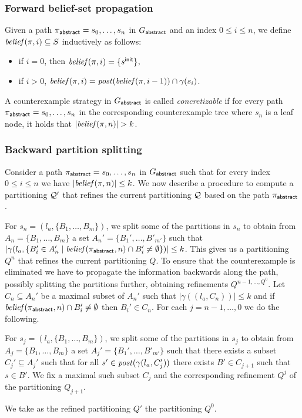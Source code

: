 \subsubsection{Forward belief-set propagation}
Given a path $\pi_{\mathsf{abstract}} = s_0,\ldots,s_n$ in $G_{\mathsf{abstract}}$ and an index $0 \leq i \leq n$, we define $\mathit{belief}(\pi,i)\subseteq S$ inductively as follows:
\begin{itemize}
\item if $i = 0$, then $\mathit{belief}(\pi,i) = \{s^{\mathsf{init}}\}$,
\item if $i > 0$, $\mathit{belief}(\pi,i) = \mathit{post}(\mathit{belief}(\pi,i-1)) \cap \gamma(s_i)$.
\end{itemize}

A counterexample strategy in $G_{\mathsf{abstract}}$ is called \emph{concretizable} if for every path $\pi_{\mathsf{abstract}} = s_0,\ldots,s_n$ in the corresponding counterexample tree where $s_n$ is a leaf node, it holds that $|\mathit{belief}(\pi,n)| > k$.

\subsubsection{Backward partition splitting}
Consider a path $\pi_{\mathsf{abstract}} = s_0,\ldots,s_n$ in $G_{\mathsf{abstract}}$ such that for every index $0 \leq i \leq n$ we have $|\mathit{belief}(\pi,n)| \leq k$. We now describe a procedure to compute a partitioning $\mathcal{Q}'$ that refines the current partitioning $\mathcal{Q}$ based on the path $\pi_{\mathsf{abstract}}$.


For $s_n  =(l_a,\{B_1,\ldots,B_m\})$, we split some of the partitions in $s_n$ to obtain from $A_n = \{B_1,\ldots,B_m\}$ a set $A_n' = \{B_1',\ldots, B'_{m'}\}$ such that $|\gamma(l_a,\{B_i' \in A_n' \mid \mathit{belief}(\pi_{\mathsf{abstract}}, n) \cap B_i' \neq \emptyset\})| \leq k$.
This gives us a partitioning $Q^n$ that refines the current partitioning $Q$. To ensure that the counterexample is eliminated we have to propagate the information backwards along the path, possibly splitting the partitions further, obtaining refinements $Q^{n-1,\ldots,Q^0}$.
Let $C_n \subseteq A_n'$ be a maximal subset of $A_n'$ such that $|\gamma((l_a,C_n))| \leq k$ and if $\mathit{belief}(\pi_{\mathsf{abstract}}, n) \cap B_i' \neq \emptyset$ then $B_i' \in C_n$.
For each $j = n-1,\ldots,0$ we do the following.

For $s_j  =(l_a,\{B_1,\ldots,B_m\})$, we split some of the partitions in $s_j$ to obtain from $A_j = \{B_1,\ldots,B_m\}$ a set $A_j' = \{B_1',\ldots, B'_{m'}\}$ such that there exists a subset $C_j'\subseteq A_j'$ such that for all $s' \in \mathit{post}(\gamma(l_a,C_j'))$ there exists $B' \in C_{j+1}$ such that $s \in B'$. We fix a maximal such subset $C_j$ and the corresponding refinement $Q^j$ of the partitioning $Q_{j+1}$. 

We take as the refined partitioning $Q'$ the partitioning $Q^0$.

\begin{example}
\end{example}

